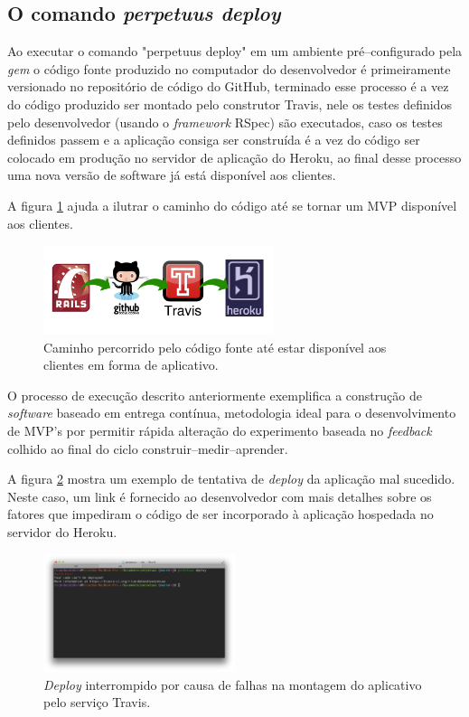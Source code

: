 \pagebreak
\subsection{O comando \emph{perpetuus deploy}}

Ao executar o comando "perpetuus deploy" em um ambiente pr\'e--configurado pela \emph{gem} o c\'odigo fonte produzido no computador do desenvolvedor \'e primeiramente versionado no reposit\'orio de c\'odigo do GitHub, terminado esse processo \'e a vez do c\'odigo produzido ser montado pelo construtor Travis, nele os testes definidos pelo desenvolvedor (usando o \emph{framework} RSpec) s\~ao executados, caso os testes definidos passem e a aplica\c{c}\~ao consiga ser constru\'ida \'e a vez do c\'odigo ser colocado em produ\c{c}\~ao no servidor de aplica\c{c}\~ao do Heroku, ao final desse processo uma nova vers\~ao de software j\'a est\'a dispon\'ivel aos clientes. 

A figura \ref{fig:fig11} ajuda a ilutrar o caminho do c\'odigo at\'e se tornar um MVP dispon\'ivel aos clientes.

\begin{figure}[h]
  \centering
  \includegraphics[width=0.6\textwidth]{./fig/cicloDeploy}
  \caption{Caminho percorrido pelo c\'odigo fonte at\'e estar dispon\'ivel aos clientes em forma de aplicativo.}
  \label{fig:fig11}
\end{figure}

O processo de execu\c{c}\~ao descrito anteriormente exemplifica a constru\c{c}\~ao de \emph{software} baseado em entrega cont\'inua, metodologia ideal para o desenvolvimento de MVP's por permitir r\'apida altera\c{c}\~ao do experimento baseada no \emph{feedback} colhido ao final do ciclo construir--medir--aprender.

\pagebreak

A figura \ref{fig:fig12} mostra um exemplo de tentativa de \emph{deploy} da aplica\c{c}\~ao mal sucedido. Neste caso, um link \'e fornecido ao desenvolvedor com mais detalhes sobre os fatores que impediram o c\'odigo de ser incorporado \`a aplica\c{c}\~ao hospedada no servidor do Heroku.

\begin{figure}[h]
  \centering
  \includegraphics[width=0.5\textwidth]{./fig/deploy1}
  \caption{\emph{Deploy} interrompido por causa de falhas na montagem do aplicativo pelo servi\c{c}o Travis.}
  \label{fig:fig12}
\end{figure}

